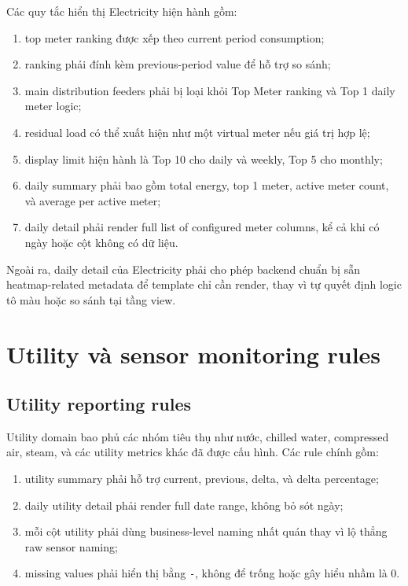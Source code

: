 Các quy tắc hiển thị Electricity hiện hành gồm:

\begin{enumerate}[label=-]
\item top meter ranking được xếp theo current period consumption;
\item ranking phải đính kèm previous-period value để hỗ trợ so sánh;
\item main distribution feeders phải bị loại khỏi Top Meter ranking và Top 1 daily meter logic;
\item residual load có thể xuất hiện như một virtual meter nếu giá trị hợp lệ;
\item display limit hiện hành là Top 10 cho daily và weekly, Top 5 cho monthly;
\item daily summary phải bao gồm total energy, top 1 meter, active meter count, và average per active meter;
\item daily detail phải render full list of configured meter columns, kể cả khi có ngày hoặc cột không có dữ liệu.
\end{enumerate}

Ngoài ra, daily detail của Electricity phải cho phép backend chuẩn bị sẵn heatmap-related metadata để template chỉ cần render, thay vì tự quyết định logic tô màu hoặc so sánh tại tầng view.

\section{Utility và sensor monitoring rules}

\subsection{Utility reporting rules}

Utility domain bao phủ các nhóm tiêu thụ như nước, chilled water, compressed air, steam, và các utility metrics khác đã được cấu hình. Các rule chính gồm:

\begin{enumerate}[label=-]
\item utility summary phải hỗ trợ current, previous, delta, và delta percentage;
\item daily utility detail phải render full date range, không bỏ sót ngày;
\item mỗi cột utility phải dùng business-level naming nhất quán thay vì lộ thẳng raw sensor naming;
\item missing values phải hiển thị bằng \texttt{-}, không để trống hoặc gây hiểu nhầm là 0.
\end{enumerate}

